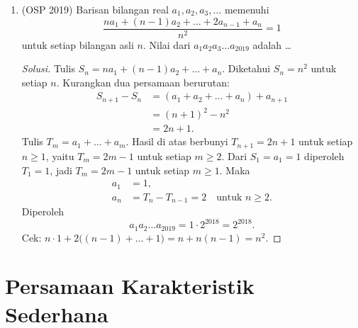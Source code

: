\documentclass[12pt]{scrartcl}
\begin{document}
\begin{enumerate}[resume]
	\item (OSP 2019)
	Barisan bilangan real $a_1, a_2, a_3, \dots$ memenuhi
	\[ \frac{na_1+(n-1)a_2+\dots+2a_{n-1}+a_n}{n^2}=1 \]
	untuk setiap bilangan asli $n$. Nilai dari $a_1a_2a_3\dots a_{2019}$ adalah \dots
	\begin{proof}[Solusi]
	\renewcommand{\qedsymbol}{$\blacksquare$}
	Tulis $S_n = na_1 + (n-1)a_2 + \dots + a_n$. Diketahui $S_n = n^2$
	untuk setiap $n$. Kurangkan dua persamaan berurutan:
	\begin{align*}
	S_{n+1} - S_n &= (a_1 + a_2 + \dots + a_n) + a_{n+1} \\
	&= (n+1)^2 - n^2 \\
	&= 2n + 1.
	\end{align*}
	Tulis $T_m = a_1 + \dots + a_m$. Hasil di atas berbunyi
	$T_{n+1} = 2n + 1$ untuk setiap $n \ge 1$, yaitu $T_m = 2m - 1$
	untuk setiap $m \ge 2$. Dari $S_1 = a_1 = 1$ diperoleh $T_1 = 1$,
	jadi $T_m = 2m - 1$ untuk setiap $m \ge 1$. Maka
	\begin{align*}
	a_1 &= 1, \\
	a_n &= T_n - T_{n-1} = 2 \quad \text{untuk } n \ge 2.
	\end{align*}
	Diperoleh
	\[ a_1a_2\dots a_{2019} = 1 \cdot 2^{2018} = 2^{2018}. \]
	Cek: $n \cdot 1 + 2\bigl((n-1) + \dots + 1\bigr) = n + n(n-1) = n^2$.
	\end{proof}

\end{enumerate}

\section{Persamaan Karakteristik Sederhana}
\end{document}
